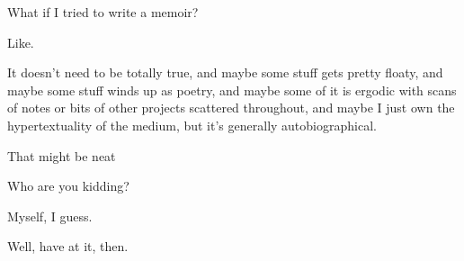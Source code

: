 \begin{paracol}{2}
  \begin{leftcolumn}

\noindent What if I tried to write a memoir?

Like.

It doesn't need to be totally true, and maybe some stuff gets pretty floaty, and maybe some stuff winds up as poetry, and maybe some of it is ergodic with scans of notes or bits of other projects scattered throughout, and maybe I just own the hypertextuality of the medium, but it's generally autobiographical.

That might be neat

\begin{ally}
Who are you kidding?
\end{ally}
Myself, I guess.

\begin{ally}
Well, have at it, then.
\end{ally}
\newpage

\end{leftcolumn}
\end{paracol}
